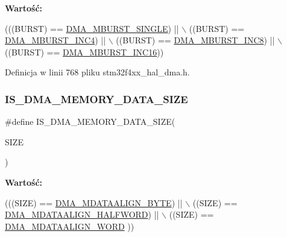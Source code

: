 {\bfseries Wartość\+:}
\begin{DoxyCode}
(((BURST) == \hyperlink{group___d_m_a___memory__burst_ga4e94b7250e6a4f53d702b42b15796953}{DMA\_MBURST\_SINGLE}) || \(\backslash\)
                                    ((BURST) == \hyperlink{group___d_m_a___memory__burst_gac9efcb13b2f0a715edb931dde213c000}{DMA\_MBURST\_INC4})   || \(\backslash\)
                                    ((BURST) == \hyperlink{group___d_m_a___memory__burst_ga4b8834930bb3b93cd3fcf04660b6933d}{DMA\_MBURST\_INC8})   || \(\backslash\)
                                    ((BURST) == \hyperlink{group___d_m_a___memory__burst_ga7812aea620b09c4f4281d614d86e6094}{DMA\_MBURST\_INC16}))
\end{DoxyCode}


Definicja w linii 768 pliku stm32f4xx\+\_\+hal\+\_\+dma.\+h.

\mbox{\label{group___d_m_a___private___macros_gac9e3748cebcb16d4ae4206d562bc804c}} 
\subsubsection{\texorpdfstring{I\+S\+\_\+\+D\+M\+A\+\_\+\+M\+E\+M\+O\+R\+Y\+\_\+\+D\+A\+T\+A\+\_\+\+S\+I\+ZE}{IS\_DMA\_MEMORY\_DATA\_SIZE}}
{\footnotesize\ttfamily \#define I\+S\+\_\+\+D\+M\+A\+\_\+\+M\+E\+M\+O\+R\+Y\+\_\+\+D\+A\+T\+A\+\_\+\+S\+I\+ZE(\begin{DoxyParamCaption}\item[{}]{S\+I\+ZE }\end{DoxyParamCaption})}

{\bfseries Wartość\+:}
\begin{DoxyCode}
(((SIZE) == \hyperlink{group___d_m_a___memory__data__size_ga9ed07bddf736298eba11508382ea4d51}{DMA\_MDATAALIGN\_BYTE})     || \(\backslash\)
                                       ((SIZE) == \hyperlink{group___d_m_a___memory__data__size_ga2c7355971c0da34a7ffe50ec87403071}{DMA\_MDATAALIGN\_HALFWORD}) || \(\backslash\)
                                       ((SIZE) == \hyperlink{group___d_m_a___memory__data__size_ga8812da819f18c873249074f3920220b2}{DMA\_MDATAALIGN\_WORD} ))
\end{DoxyCode}


